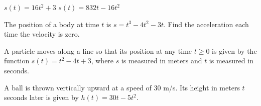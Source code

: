 \documentclass[addpoints, 12pt]{exam}
\begin{document}
\begin{questions}
    \question $s(t)=16t^2+3$
    \question $s(t)=832t-16t^2$
    
    \newpage
    
    
    \question The position of a body at time $t$ is $s=t^3-4t^2-3t$. Find the acceleration each time the velocity is zero.
    
    \question A particle moves along a line so that its position at any time $t\ge0$ is given by the function $s(t)=t^2-4t+3$, where $s$ is measured in meters and $t$ is measured in seconds.
    
    \question A ball is thrown vertically upward at a speed of 30 m/s. Its height in meters $t$ seconds later is given by $h(t)=30t-5t^2$.
\end{questions}
\end{document}
